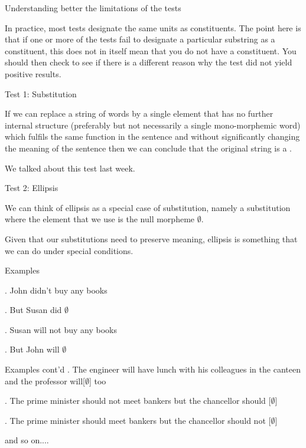 \begin{frame}
{Understanding better the limitations of the tests}

In practice, most tests designate the same units as constituents.  The point here is that if one or more of the tests fail to designate a particular substring as a constituent, this does not in itself mean that you do not have a constituent.  You should then check to see if there is a different reason why the test did not yield positive results.
\end{frame}


\begin{frame}
  {Test 1: Substitution}


  \begin{block}
    {}
  If we can replace a string of words by a single element that has no further internal structure (preferably but not necessarily a single mono-morphemic word) which fulfils the same function in the sentence and without significantly changing the meaning of the sentence then we can conclude that the original string is a .
  \end{block}

We talked about this test last week.

\end{frame}

\begin{frame}
  {Test 2: Ellipsis}

We can think of ellipsis as a special case of substitution, namely a substitution where the element that we use is the null morpheme $\emptyset$.

\pause

Given that our substitutions need to preserve meaning, ellipsis is something that we can do under special conditions.


\end{frame}


\begin{frame}
  {Examples}

\ex. 
John didn't buy any books

\ex.  But Susan did $\emptyset$

\ex.
Susan will not buy any books

\ex.  But John will $\emptyset$

\end{frame}


\begin{frame}
  {Examples cont'd}
\ex.
The engineer will have lunch with his colleagues in the canteen and the professor will[$\emptyset$] too

\ex. 
The prime minister should not meet bankers but the chancellor should [$\emptyset$]

\ex. 
The prime minister should meet bankers but the chancellor should not [$\emptyset$]

and so on....

\end{frame}


